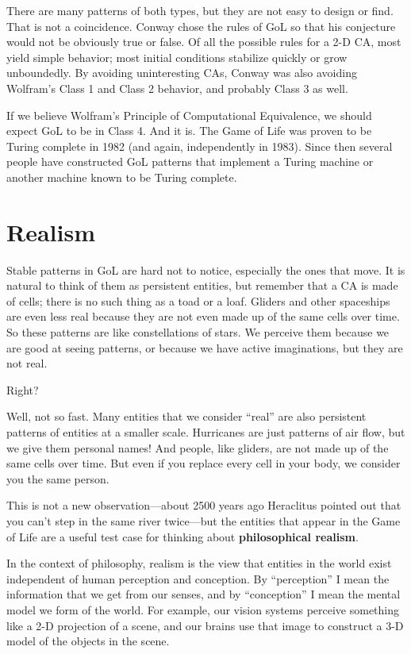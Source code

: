 \documentclass[10pt]{book}
\begin{document}
There are many patterns of both types, but they are not easy to
design or find.  That is not a coincidence.  Conway chose the
rules of GoL so that his conjecture would not be obviously
true or false.  Of all the possible rules for a 2-D CA, most
yield simple behavior; most initial conditions stabilize quickly
or grow unboundedly.  By avoiding uninteresting CAs, Conway
was also avoiding Wolfram's Class 1 and Class 2 behavior, and
probably Class 3 as well.

If we believe Wolfram's Principle of Computational Equivalence, we
should expect GoL to be in Class 4.  And it is.  The Game of Life was
proven to be Turing complete in 1982 (and again, independently in
1983).  Since then several people have constructed GoL patterns that
implement a Turing machine or another machine known to be Turing
complete.



\section{Realism}

Stable patterns in GoL are hard not to notice, especially the ones
that move.  It is natural to think of them as persistent entities, but
remember that a CA is made of cells; there is no such thing as a toad
or a loaf.  Gliders and other spaceships are even less real because
they are not even made up of the same cells over time.  So these
patterns are like constellations of stars.  We perceive them because
we are good at seeing patterns, or because we have active
imaginations, but they are not real.

Right?

Well, not so fast.  Many entities that we consider
``real'' are also persistent patterns of entities at a smaller
scale.  Hurricanes are just patterns of air flow, but we give
them personal names!  And people, like gliders, are not made
up of the same cells over time.  But even if you replace every
cell in your body, we consider you the same person.

This is not a new observation---about 2500 years ago Heraclitus
pointed out that you can't step in the same river twice---but the
entities that appear in the Game of Life are a useful test case for
thinking about {\bf philosophical realism}.

In the context of philosophy, realism is the view that entities
in the world exist independent of human perception and conception.
By ``perception'' I mean the information that we get from
our senses, and by ``conception'' I mean the mental model
we form of the world.  For example, our vision systems perceive
something like a 2-D projection of a scene, and our brains
use that image to construct a 3-D model of the objects in the
scene.
\end{document}
